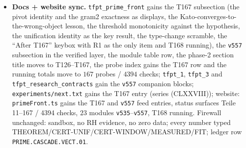 \documentclass[11pt]{article}
\begin{document}
\begin{itemize}[leftmargin=1.5em]
(\texttt{lagrange\_minors\_probe.py}, contract \texttt{LAGRANGE.MINORS}) is running ---
the Lagrange identity, the determinant as a sum of squares.
\item \textbf{Docs + website sync.} \texttt{tfpt\_prime\_front} gains the T167
subsection (the pivot identity and the gram2 exactness as displays, the
Kato-converges-to-the-wrong-object lesson, the threshold monotonicity against the
hypothesis, the unification identity as the key result, the type-change scramble, the
``After T167'' keybox with R1 as the only item and T168 running), the \texttt{v557}
subsection in the verified layer, the module table row, the phase-2 section title moves
to T126--T167, the probe index gains the T167 row and the running totals move to $167$
probes / $4394$ checks; \texttt{tfpt\_1}, \texttt{tfpt\_3} and
\texttt{tfpt\_research\_contracts} gain the \texttt{v557} companion blocks;
\texttt{experiments/next.txt} gains the T167 entry (series (CLXXVIII));
website: \texttt{primeFront.ts} gains the T167 and \texttt{v557} feed entries, status
surfaces Teile 11--167 / 4394 checks, $23$ modules \texttt{v535}--\texttt{v557}, T168
running. Firewall unchanged: sandbox, no RH evidence, no zero data; every number typed
THEOREM/CERT-UNIF/CERT-WINDOW/MEASURED/FIT; ledger row \texttt{PRIME.CASCADE.VECT.01}.
\end{itemize}
\end{document}
